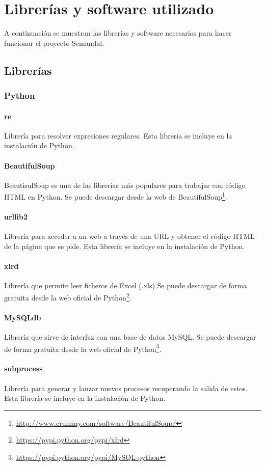 \chapter{Librerías y software utilizado}
\label{anexo:libreria}
A continuación se muestran las librerías y software necesarios para hacer funcionar el proyecto Semandal.
\section{Librerías}
\subsection{Python}
\subsubsection{re}
Librería para resolver expresiones regulares.
Esta librería se incluye en la instalación de Python.
\subsubsection{BeautifulSoup}
BeautisulSoup es una de las librerías más populares para trabajar con código HTML en Python.
Se puede descargar desde la web de BeautifulSoup\footnote{\url{http://www.crummy.com/software/BeautifulSoup/}}.
\subsubsection{urllib2}
Librería para acceder a un web a través de una URL y obtener el código HTML de la página que se pide.
Esta librería se incluye en la instalación de Python.
\subsubsection{xlrd}
Librería que permite leer ficheros de Excel (.xls) Se puede descargar de forma gratuita desde la web oficial de Python\footnote{\url{https://pypi.python.org/pypi/xlrd}}.
\subsubsection{MySQLdb}
Librería que sirve de interfaz con una base de datos MySQL. Se puede descargar de forma gratuita desde la web oficial de Python\footnote{\url{https://pypi.python.org/pypi/MySQL-python}}.
\subsubsection{subprocess}
Librería para generar y lanzar nuevos procesos recuperando la salida de estos.
Esta librería se incluye en la instalación de Python.
